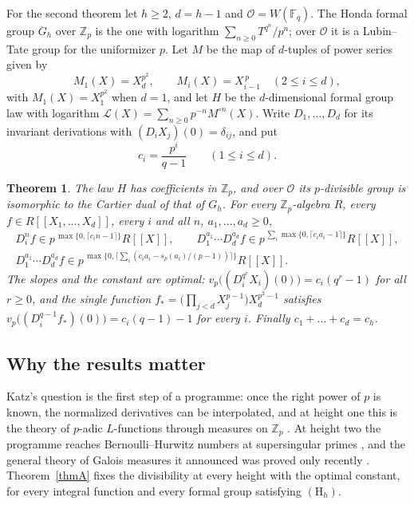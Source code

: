 \documentclass[11pt]{amsart}
\newtheorem{theorem}{Theorem}
\theoremstyle{definition}
\theoremstyle{remark}
\newcommand{\Z}{\mathbb Z}
\newcommand{\F}{\mathbb F}
\newcommand{\vp}{v_p}
\begin{document}
For the second theorem let $h\ge2$, $d=h-1$ and $\mathcal O=W(\F_q)$. The Honda formal group $G_h$ over $\Z_p$ is the one with logarithm $\sum_{n\ge0}T^{q^n}/p^n$; over $\mathcal O$ it is a Lubin--Tate group for the uniformizer $p$. Let $M$ be the map of $d$-tuples of power series given by
\[
 M_1(X)=X_d^{p^2},\qquad M_i(X)=X_{i-1}^{\,p}\quad(2\le i\le d),
\]
with $M_1(X)=X_1^{p^2}$ when $d=1$, and let $H$ be the $d$-dimensional formal group law with logarithm $\mathcal L(X)=\sum_{n\ge0}p^{-n}M^{\circ n}(X)$. Write $D_1,\dots,D_d$ for its invariant derivations with $(D_iX_j)(0)=\delta_{ij}$, and put
\[
 c_i=\frac{p^i}{q-1}\qquad(1\le i\le d).
\]

\begin{theorem}\label{thmC}
The law $H$ has coefficients in $\Z_p$, and over $\mathcal O$ its $p$-divisible group is isomorphic to the Cartier dual of that of $G_h$. For every $\Z_p$-algebra $R$, every $f\in R[[X_1,\dots,X_d]]$, every $i$ and all $n$, $a_1,\dots,a_d\ge0$,
\begin{gather*}
 D_i^nf\in p^{\,\max\{0,\lceil c_in-1\rceil\}}R[[X]],\qquad
 D_1^{a_1}\cdots D_d^{a_d}f\in p^{\,\sum_i\max\{0,\lceil c_ia_i-1\rceil\}}R[[X]],\\
 D_1^{a_1}\cdots D_d^{a_d}f\in p^{\,\max\{0,\lceil\sum_i(c_ia_i-s_p(a_i)/(p-1))\rceil\}}R[[X]].
\end{gather*}
The slopes and the constant are optimal: $\vp\bigl((D_i^{q^r}X_i)(0)\bigr)=c_i(q^r-1)$ for all $r\ge0$, and the single function $f_*=\bigl(\prod_{j<d}X_j^{p-1}\bigr)X_d^{p^2-1}$ satisfies $\vp\bigl((D_i^{q-1}f_*)(0)\bigr)=c_i(q-1)-1$ for every $i$. Finally $c_1+\dots+c_d=c_h$.
\end{theorem}

\subsection{Why the results matter}
Katz's question is the first step of a programme: once the right power of $p$ is known, the normalized derivatives can be interpolated, and at height one this is the theory of $p$-adic $L$-functions through measures on $\Z_p$ \cite[\S\S III--V]{Katz77}. At height two the programme reaches Bernoulli--Hurwitz numbers at supersingular primes \cite{Katz81,Chellali90,BK16}, and the general theory of Galois measures it announced was proved only recently \cite{Berger25}. Theorem~\ref{thmA} fixes the divisibility at every height with the optimal constant, for every integral function and every formal group satisfying $(\mathrm H_h)$.
\end{document}
